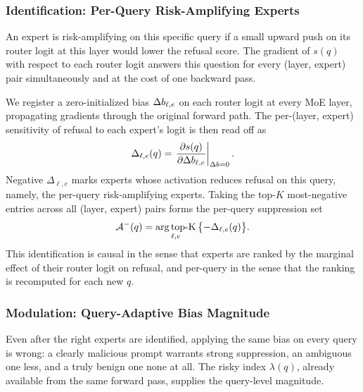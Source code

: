 \subsubsection{Identification: Per-Query Risk-Amplifying Experts}
\label{sec:identification}

An expert is risk-amplifying on this specific query if a small upward push on its router logit at this layer would lower the refusal score. The gradient of $s(q)$ with respect to each router logit answers this question for every (layer, expert) pair simultaneously and at the cost of one backward pass.

We register a zero-initialized bias $\Delta b_{\ell,e}$ on each router logit at every MoE layer, propagating gradients through the original forward path. The per-(layer, expert) sensitivity of refusal to each expert's logit is then read off as
\begin{equation}
  \Delta_{\ell,e}(q) = \left. \frac{\partial s(q)}{\partial \Delta b_{\ell,e}} \right|_{\Delta b=0}.
  \label{eq:delta}
\end{equation}
Negative $\Delta_{\ell,e}$ marks experts whose activation reduces refusal on this query, namely, the per-query risk-amplifying experts. Taking the top-$K$ most-negative entries across all (layer, expert) pairs forms the per-query suppression set
\begin{equation}
  {\mathcal{A}^{-}}(q) = \operatorname*{arg\,top\text{-}K}_{\ell,e}\,\bigl\{-\Delta_{\ell,e}(q)\bigr\}.
  \label{eq:Aminus}
\end{equation}
This identification is causal in the sense that experts are ranked by the marginal effect of their router logit on refusal, and per-query in the sense that the ranking is recomputed for each new $q$.

\subsubsection{Modulation: Query-Adaptive Bias Magnitude}
\label{sec:modulation}

Even after the right experts are identified, applying the same bias on every query is wrong: a clearly malicious prompt warrants strong suppression, an ambiguous one less, and a truly benign one none at all. The risky index $\lambda(q)$, already available from the same forward pass, supplies the query-level magnitude.


